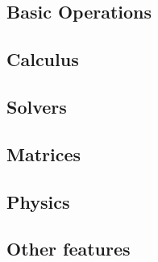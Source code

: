 
\subsection{Basic Operations}

\subsection{Calculus}

\subsection{Solvers}


\subsection{Matrices}

\subsection{Physics}


\subsection{Other features}
